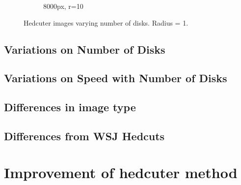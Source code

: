 \documentclass[11pt]{article}
\begin{document}
\begin{figure}[H]
\begin{subfigure}[b]{0.2\linewidth}
		\caption{8000px, r=10}
	\end{subfigure}
	\caption{Hedcuter images varying number of disks. Radius = 1.}
	\label{fig:vc_points1}
\end{figure}








\subsection{Variations on Number of Disks}

\subsection{Variations on Speed with Number of Disks}

\subsection{Differences in image type}

\subsection{Differences from WSJ Hedcuts}

\section{Improvement of hedcuter method}



\end{document}

